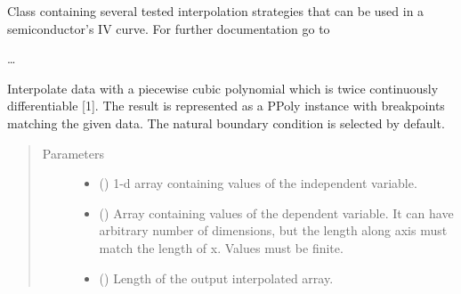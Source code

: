 \documentclass[letterpaper,10pt,english,openany, oneside]{sphinxmanual}
\begin{document}

\begin{fulllineitems}
\label{\detokenize{index:fompy.conditioning.interpolator}}
Class containing several tested interpolation strategies that can be used in a semiconductor’s IV curve.
For further documentation go to  

…

\begin{fulllineitems}
\label{\detokenize{index:fompy.conditioning.interpolator.spline_interpol}}
Interpolate data with a piecewise cubic polynomial which is twice
continuously differentiable {[}1{]}. The result is represented as a PPoly
instance with breakpoints matching the given data. The natural boundary
condition is selected by default.

\end{fulllineitems}

\begin{quote}\begin{description}
\item[{Parameters}] \leavevmode\begin{itemize}
\item {} 
 (\sphinxstyleliteralemphasis{\sphinxupquote{, }}\sphinxstyleliteralemphasis{\sphinxupquote{ (}}\sphinxstyleliteralemphasis{\sphinxupquote{,}}\sphinxstyleliteralemphasis{\sphinxupquote{)}}) \textendash{} 1-d array containing values of the independent variable.

\item {} 
 () \textendash{} Array containing values of the dependent variable.
It can have arbitrary number of dimensions, but the length along axis
must match the length of x. Values must be finite.

\item {} 
 () \textendash{} Length of the output interpolated array.


\end{itemize}
\end{description}
\end{quote}
\end{fulllineitems}
\end{document}
